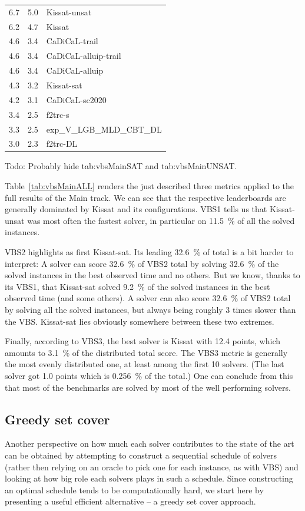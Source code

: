 \documentclass{elsarticle}
\newcommand{\todo}[1]{{\color{purple}Todo: #1}}
\begin{document}
\begin{table}
\begin{center}
\begin{tabular}{ccl}
\hline
6.7 & 5.0 & Kissat-unsat \\
6.2 & 4.7 & Kissat \\
4.6 & 3.4 & CaDiCaL-trail \\
4.6 & 3.4 & CaDiCaL-alluip-trail \\
4.6 & 3.4 & CaDiCaL-alluip \\
4.3 & 3.2 & Kissat-sat \\
4.2 & 3.1 & CaDiCaL-sc2020 \\
3.4 & 2.5 & f2trc-s \\
3.3 & 2.5 & exp\_V\_LGB\_MLD\_CBT\_DL \\
3.0 & 2.3 & f2trc-DL \\
\end{tabular}
\end{center}
\end{table}

\todo{Probably hide tab:vbsMainSAT and tab:vbsMainUNSAT.} 

Table~\ref{tab:vbsMainALL} renders the just described three metrics applied 
to the full results of the Main track. We can see that the respective leaderboards 
are generally dominated by Kissat and its configurations.
VBS1 tells us that Kissat-unsat was most often the fastest solver,
in particular on \SI{11.5}{\percent} of all the solved instances.

VBS2 highlights as first Kissat-sat. Its leading \SI{32.6}{\percent} of total is a bit harder to 
interpret: A solver can score \SI{32.6}{\percent} of VBS2 total
by solving \SI{32.6}{\percent} of the solved instances in the best observed time
and no others. But we know, thanks to its VBS1, that Kissat-sat solved \SI{9.2}{\percent}
of the solved instances in the best observed time (and some others).
A solver can also score \SI{32.6}{\percent} of VBS2 total by solving all the solved instances,
but always being roughly 3 times slower than the VBS. 
Kissat-sat lies obviously somewhere between these two extremes.

Finally, according to VBS3, the best solver is Kissat with 12.4 points,
which amounts to \SI{3.1}{\percent} of the distributed total score.
The VBS3 metric is generally the most evenly distributed one,
at least among the first 10 solvers. 
(The last solver got 1.0 points which is \SI{0.256}{\percent} of the total.)
One can conclude from this that most of the benchmarks are solved
by most of the well performing solvers. 

\subsection{Greedy set cover}
Another perspective on how much each solver contributes to the state of the art
can be obtained by attempting to construct a sequential schedule of solvers 
(rather then relying on an oracle to pick one for each instance, as with VBS)
and looking at how big role each solvers plays in such a schedule. Since constructing 
an optimal schedule tends to be computationally hard, we start here by 
presenting a useful efficient alternative -- a greedy set cover approach.
\end{document}
